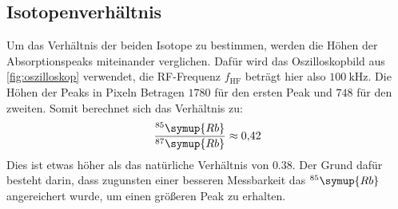 \subsection{Isotopenverhältnis}

Um das Verhältnis der beiden Isotope zu bestimmen, werden die Höhen der Absorptionspeaks miteinander verglichen.
Dafür wird das Oszilloskopbild aus \autoref{fig:oszilloskop} verwendet, die RF-Frequenz $f_{\text{HF}}$ beträgt
hier also $\qty{100}{\kilo\hertz}$.
Die Höhen der Peaks in Pixeln Betragen $1780$ für den ersten Peak und $748$ für den zweiten.
Somit berechnet sich das Verhältnis zu:
\begin{align*}
  \frac{^{85}\symup{Rb}}{^{87}\symup{Rb}} \approx \qty{0.42}{}
\end{align*}
Dies ist etwas höher als das natürliche Verhältnis von $0.38$. Der Grund dafür besteht darin, dass zugunsten einer
besseren Messbarkeit das $^{85}\symup{Rb}$ angereichert wurde, um einen größeren Peak zu erhalten.